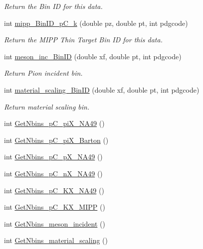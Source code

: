 \begin{DoxyCompactItemize}
\begin{DoxyCompactList}\small\item\em Return the Bin I\-D for this data. \end{DoxyCompactList}\item 
int \hyperlink{class_neutrino_flux_reweight_1_1_thin_target_bins_a075666bbc0f2f979df1818ab1633ec2e}{mipp\-\_\-\-Bin\-I\-D\-\_\-p\-C\-\_\-k} (double pz, double pt, int pdgcode)
\begin{DoxyCompactList}\small\item\em Return the M\-I\-P\-P Thin Target Bin I\-D for this data. \end{DoxyCompactList}\item 
int \hyperlink{class_neutrino_flux_reweight_1_1_thin_target_bins_ab9d406726272e5ad8c5daa45b7e9c2b0}{meson\-\_\-inc\-\_\-\-Bin\-I\-D} (double xf, double pt, int pdgcode)
\begin{DoxyCompactList}\small\item\em Return Pion incident bin. \end{DoxyCompactList}\item 
int \hyperlink{class_neutrino_flux_reweight_1_1_thin_target_bins_a83026aace7c168de2cabbe056daa9da4}{material\-\_\-scaling\-\_\-\-Bin\-I\-D} (double xf, double pt, int pdgcode)
\begin{DoxyCompactList}\small\item\em Return material scaling bin. \end{DoxyCompactList}\item 
int \hyperlink{class_neutrino_flux_reweight_1_1_thin_target_bins_ae37e498809fe6a8811d16830048f62bc}{Get\-Nbins\-\_\-p\-C\-\_\-pi\-X\-\_\-\-N\-A49} ()
\item 
int \hyperlink{class_neutrino_flux_reweight_1_1_thin_target_bins_a489773ef42e1f1da75ee88e3b6b683c2}{Get\-Nbins\-\_\-p\-C\-\_\-pi\-X\-\_\-\-Barton} ()
\item 
int \hyperlink{class_neutrino_flux_reweight_1_1_thin_target_bins_a70e30bd5ca9770ed8d5f9bf828f92977}{Get\-Nbins\-\_\-p\-C\-\_\-p\-X\-\_\-\-N\-A49} ()
\item 
int \hyperlink{class_neutrino_flux_reweight_1_1_thin_target_bins_a987e8420e8242685cbdedf2b14d36516}{Get\-Nbins\-\_\-p\-C\-\_\-n\-X\-\_\-\-N\-A49} ()
\item 
int \hyperlink{class_neutrino_flux_reweight_1_1_thin_target_bins_a36c96229c2221f3b8ae58056002d421d}{Get\-Nbins\-\_\-p\-C\-\_\-\-K\-X\-\_\-\-N\-A49} ()
\item 
int \hyperlink{class_neutrino_flux_reweight_1_1_thin_target_bins_a12d09bec541b062cf65a41cce63de92f}{Get\-Nbins\-\_\-p\-C\-\_\-\-K\-X\-\_\-\-M\-I\-P\-P} ()
\item 
int \hyperlink{class_neutrino_flux_reweight_1_1_thin_target_bins_a7eaa9fff3db53cbc3678232a8eb308b9}{Get\-Nbins\-\_\-meson\-\_\-incident} ()
\item 
int \hyperlink{class_neutrino_flux_reweight_1_1_thin_target_bins_aee420cb46b44b6a809d5d7211d1f7943}{Get\-Nbins\-\_\-material\-\_\-scaling} ()
\end{DoxyCompactItemize}
